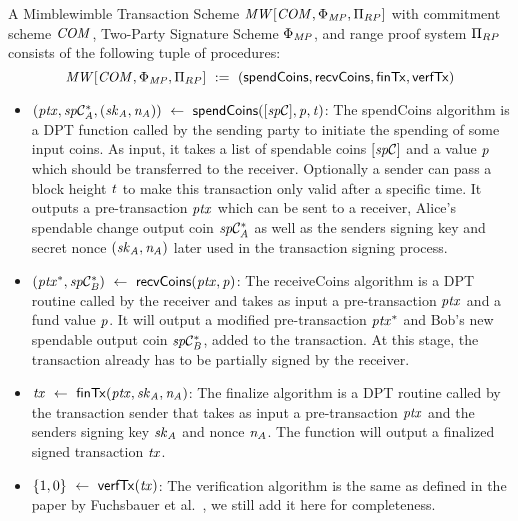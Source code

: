 \begin{definition}
    \label{def:atom:mw-tx-scheme}
    A Mimblewimble Transaction Scheme $\mathit{MW}[\mathit{COM},\Phi_{\mathit{MP}},\Pi_{RP}]$ with commitment scheme $\mathit{COM}$, Two-Party Signature Scheme $\Phi_{\mathit{MP}}$, and range proof system $\Pi_{RP}$ consists of the following tuple of procedures:
    \[ \mathit{MW}[\mathit{COM},\Phi_{\mathit{MP}},\Pi_{RP}] ~:=~ ( \mathsf{spendCoins},\mathsf{recvCoins},\mathsf{finTx},\mathsf{verfTx} ) \]
    \begin{itemize}
        \item $(\mathit{ptx}, \mathit{sp}\mathcal{C}_{\mathit{A}}^*, (\mathit{sk}_{\mathit{A}}, \mathit{\mathit{n}_{\mathit{A}}})) ~\leftarrow~ \mathsf{spendCoins}([\mathit{sp}\mathcal{C}],\mathit{p},\mathit{t})$: The spendCoins algorithm is a DPT function called by the sending party to initiate the spending of some input coins.
        As input, it takes a list of spendable coins $[\mathit{sp}\mathcal{C}]$ and a value $\mathit{p}$ which should be transferred to the receiver.
        Optionally a sender can pass a block height $\mathit{t}$ to make this transaction only valid after a specific time.
        It outputs a pre-transaction $\mathit{ptx}$ which can be sent to a receiver, Alice's spendable change output coin $\mathit{sp}\mathcal{C}_{\mathit{A}}^*$ as well as the senders signing key and secret nonce $(\mathit{sk}_{\mathit{A}}, \mathit{\mathit{n}_{\mathit{A}}})$ later used in the transaction signing process.
        \item $(\mathit{ptx}^*, \mathit{sp}\mathcal{C}_{\mathit{B}}^*) ~\leftarrow~ \mathsf{recvCoins}(\mathit{ptx},\mathit{p})$: The receiveCoins algorithm is a DPT routine called by the receiver and takes as input a pre-transaction $\mathit{ptx}$ and a fund value
        $\mathit{p}$.
        It will output a modified pre-transaction $\mathit{ptx}^*$ and Bob's new spendable output coin $\mathit{sp}\mathcal{C}_{\mathit{B}}^*$, added to the transaction.
        At this stage, the transaction already has to be partially signed by the receiver.
        \item $\mathit{tx} ~\leftarrow~ \mathsf{finTx}(\mathit{ptx},\mathit{sk}_{\mathit{A}},\mathit{\mathit{n}_{\mathit{A}}})$: The finalize algorithm is a DPT routine called by the transaction sender that takes as input a pre-transaction $\mathit{ptx}$ and the senders signing key $\mathit{sk}_{\mathit{A}}$ and nonce $\mathit{\mathit{n}_{\mathit{A}}}$.
        The function will output a finalized signed transaction $\mathit{tx}$.
        \item $\{1,0\} ~\leftarrow~ \mathsf{verfTx}(\mathit{tx})$: The verification algorithm is the same as defined in the paper by Fuchsbauer et al.~\cite{fuchsbauer2019aggregate}, we still add it here for completeness.

\end{itemize}
\end{definition}
